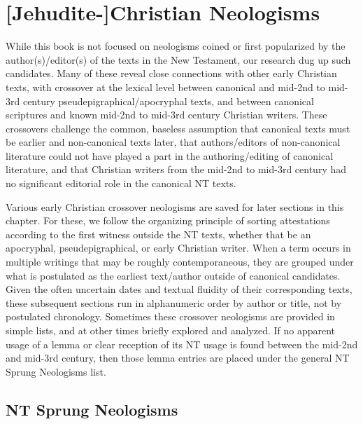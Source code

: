 %
%
\chapter{[Jehudite-]Christian Neologisms}%
%
\vspace*{3mm}
%
\justifying

\noindent{}While this book is not focused on neologisms %
coined or first popularized by the author(s)/editor(s) of the texts in the New Testament, %
our research dug up such candidates. %
Many of these reveal close connections with other early Christian texts, %
with crossover at the lexical level between canonical and mid-2nd to mid-3rd century pseudepigraphical/apocryphal texts, %
and between canonical scriptures and known mid-2nd to mid-3rd century Christian writers. %
These crossovers challenge the common, baseless assumption %
that canonical texts must be earlier and non-canonical texts later, %
that authors/editors of non-canonical literature %
could not have played a part in the authoring/editing of canonical literature, %
and that Christian writers from the mid-2nd to mid-3rd century had no significant editorial role in the canonical NT texts. %

Various early Christian crossover neologisms are saved for later sections in this chapter. 
For these, we follow the organizing principle of sorting attestations according to the first witness outside the %
NT texts, whether that be an apocryphal, pseudepigraphical, or early Christian writer. %
When a term occurs in multiple writings that may be roughly contemporaneous, %
they are grouped under what is postulated %
as the earliest text/author outside of canonical candidates. %
Given the often uncertain dates and textual fluidity of their corresponding texts, %
these subsequent sections run in alphanumeric order by author or title, %
not by postulated chronology. %
Sometimes these crossover neologisms are provided in simple lists, %
and at other times briefly explored and analyzed.
If no apparent usage of a lemma or clear reception of its NT usage is found between the mid-2nd and mid-3rd century, %
then those lemma entries are placed under the general NT Sprung Neologisms list. \clearpage %

\section{NT Sprung Neologisms}

